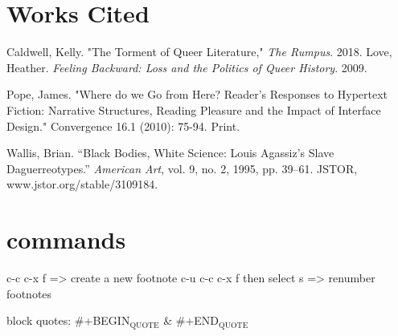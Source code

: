\documentclass[11pt]{article}
\begin{document}
\section{Works Cited}
\label{sec:org6d235f7}
Caldwell, Kelly. "The Torment of Queer Literature," \emph{The Rumpus}. 2018.
Love, Heather. \emph{Feeling Backward: Loss and the Politics of Queer
History}. 2009.

Pope, James. "Where do we Go from Here? Reader’s Responses to Hypertext Fiction:
Narrative Structures, Reading Pleasure and the Impact of Interface Design." Convergence 16.1 (2010): 75-94. Print.


Wallis, Brian. “Black Bodies, White Science: Louis Agassiz's Slave
Daguerreotypes.” \emph{American Art}, vol. 9, no. 2, 1995, pp. 39–61. JSTOR,
www.jstor.org/stable/3109184.


\section{commands}
\label{sec:org14070b2}
c-c c-x f => create a new footnote
c-u c-c c-x f then select s => renumber footnotes

block quotes: \#+BEGIN\(_{\text{QUOTE}}\) \& \#+END\(_{\text{QUOTE}}\)
\end{document}
